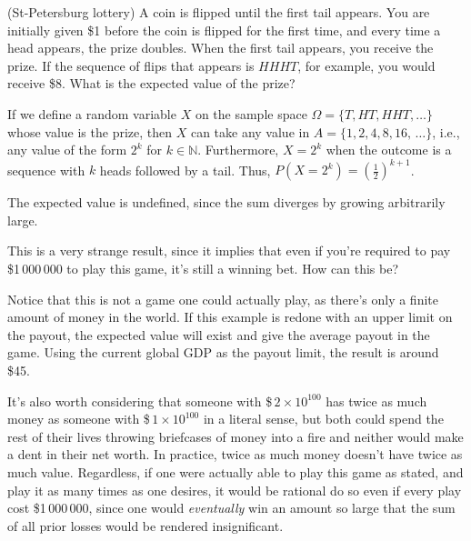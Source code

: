 \begin{examp}
(St-Petersburg lottery) A coin is flipped until the first tail appears. You are initially given \$1 before the coin is flipped for the first time, and every time a head appears, the prize doubles. When the first tail appears, you receive the prize. If the sequence of flips that appears is $HHHT$, for example, you would receive \$8. What is the expected value of the prize?
\par
\noindent If we define a random variable $X$ on the sample space $\Omega = \{T, HT, HHT, \dots\}$ whose value is the prize, then $X$ can take any value in $A = \{1,2,4,8,16, \,\dots\}$, i.e., any value of the form $2^k$ for $k \in \mathbb{N}$. Furthermore, $X = 2^k$ when the outcome is a sequence with $k$ heads followed by a tail. Thus, $P(X = 2^k) = \left(\frac{1}{2}\right)^{k+1}$.
\par
\noindent The expected value is undefined, since the sum diverges by growing arbitrarily large. 
\end{examp}
\par
This is a very strange result, since it implies that even if you're required to pay \$1\,000\,000 to play this game, it's still a winning bet. How can this be?
\par
Notice that this is not a game one could actually play, as there's only a finite amount of money in the world. If this example is redone with an upper limit on the payout, the expected value will exist and give the average payout in the game. Using the current global GDP as the payout limit, the result is around \$45.
\par
It's also worth considering that someone with \$\,$2 \times 10^{100}$ has twice as much money as someone with \$\,$1 \times 10^{100}$ in a literal sense, but both could spend the rest of their lives throwing briefcases of money into a fire and neither would make a dent in their net worth. In practice, twice as much money doesn't have twice as much value. Regardless, if one were actually able to play this game as stated, and play it as many times as one desires, it would be rational do so even if every play cost \$1\,000\,000, since one would \emph{eventually} win an amount so large that the sum of all prior losses would be rendered insignificant. 

